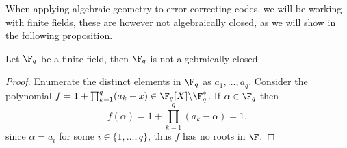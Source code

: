 When applying algebraic geometry to error correcting codes, we will be working with finite fields, these are however not algebraically closed, as we will show in the following proposition.
\begin{proposition}\label{prop:finite_fields_arent_algebraicly_closed}
  Let $\F_{q}$ be a finite field, then $\F_{q}$ is not algebraically closed
\end{proposition}
\begin{proof}
  Enumerate the distinct elements in $\F_{q}$ as $a_{1}, \ldots, a_{q}$. Consider the polynomial $f = 1 + \prod^{q}_{k = 1} (a_{k} - x) \in \F_{q}[X] \backslash \F_{q}^{*}$. If $\alpha \in \F_{q}$ then
  \begin{equation*}
    f(\alpha) = 1 + \prod^{q}_{k = 1} (a_{k} - \alpha) = 1,
  \end{equation*}
  since $\alpha = a_{i}$ for some $i \in \{1, \ldots, q\}$, thus $f$ has no roots in $\F$.
\end{proof}

%

